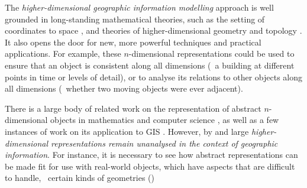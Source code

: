 
The \emph{higher-dimensional geographic information modelling} approach is well grounded in long-standing mathematical theories, such as the setting of coordinates to space \citep{Descartes37}, and theories of higher-dimensional geometry \citep{Riemann68} and topology \citep{Poincare95}.
It also opens the door for new, more powerful techniques and practical applications.
For example, these $n$-dimensional representations could be used to ensure that an object is consistent along all dimensions (\eg\ a building at different points in time or levels of detail), or to analyse its relations to other objects along all dimensions (\eg\ whether two moving objects were ever adjacent).


There is a large body of related work on the representation of abstract $n$-dimensional objects in mathematics and computer science \citep{Brisson93,Lienhardt94}, as well as a few instances of work on its application to GIS \citep{Karimipour10}.
However, by and large \emph{higher-dimensional representations remain unanalysed in the context of geographic information}.
For instance, it is necessary to see how abstract representations can be made fit for use with real-world objects, which have aspects that are difficult to handle, \eg\ certain kinds of geometries ()%
%
